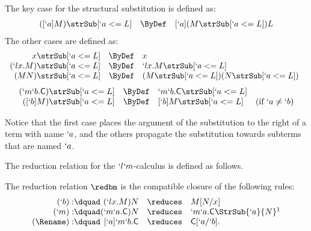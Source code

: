 \documentclass{CSML}
\begin{document}
 \begin{defi} \label{def:substitution}
The key case for the structural substitution is defined as:
%
%
 \[ \begin{array}{rcl}
([`a]M) \strSub[`a<=L] & \ByDef & [`a](M \strSub[`a<=L])L 
 \end{array} \]
The other cases are defined as:
%
%
 \[ \begin{array}{rcl@{\quad}l}
x \strSub[`a<=L] & \ByDef & x \\
(`lx.M) \strSub[`a<=L] & \ByDef & `lx.M \strSub[`a<=L] \\
(MN) \strSub[`a<=L] & \ByDef & (M \strSub[`a<=L])(N \strSub[`a<=L]) \\
 \end{array} \]
 \[ \begin{array}{rcl@{\quad}l}
(`m`b.\Cmd) \strSub[`a<=L] & \ByDef & `m`b.\Cmd \strSub[`a<=L] \\
([`b]M) \strSub[`a<=L] & \ByDef & [`b]M \strSub[`a<=L] & (\textrm{if }`a \neq`b )
 \end{array} \]
 \end{defi}
Notice that the first case places the argument of the substitution to the right of a term with name $`a$, and the others propagate the substitution towards subterms that are named $`a$.

The reduction relation for the $`l`m$-calculus is defined as follows.

 \begin{defi} \label{def:reduction}
The reduction relation $\redbm$ is the compatible closure of the following rules:
%
%
 \[ \begin{array}{r@{\dquad}rcll}
(`b): & (`lx.M)N & \reduces & M[N/x] \\
(`m): & (`m`a.\Cmd)N & \reduces & `m`a.\Cmd\StrSub{`a}{N} \footnotemark \\
(\Rename): & [`a]`m`b.\Cmd & \reduces & \Cmd[`a/`b] .
 \end{array} \]
 \end{defi}
\end{document}
